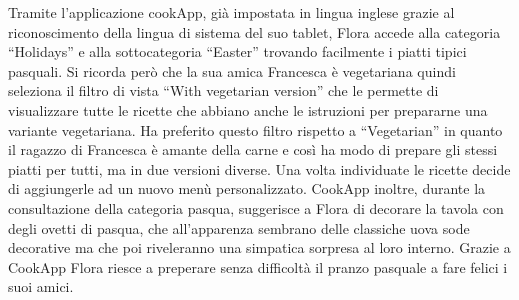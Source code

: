 \begin{enumerate}
Tramite l'applicazione
cookApp, già impostata in lingua inglese grazie al riconoscimento della lingua
di sistema del suo tablet, Flora accede alla categoria ``Holidays'' e alla
sottocategoria ``Easter'' trovando facilmente i piatti tipici pasquali. 
Si ricorda però che la sua amica Francesca è vegetariana quindi
seleziona il filtro di vista ``With vegetarian version'' che le permette
di visualizzare tutte le ricette che abbiano anche le istruzioni per
prepararne una variante vegetariana. Ha preferito questo filtro rispetto
a ``Vegetarian'' in quanto il ragazzo di Francesca è amante della carne e
così ha modo di prepare gli stessi piatti per tutti, ma in due versioni
diverse. Una volta individuate le ricette decide di aggiungerle ad un
nuovo menù personalizzato. CookApp inoltre, durante la consultazione
della categoria pasqua, suggerisce a Flora di decorare la
tavola con degli ovetti di pasqua, che all'apparenza sembrano delle
classiche uova sode decorative ma che poi riveleranno una simpatica sorpresa al
loro interno. Grazie a CookApp Flora riesce a preperare senza difficoltà
il pranzo pasquale a fare felici i suoi amici.



\end{enumerate}
